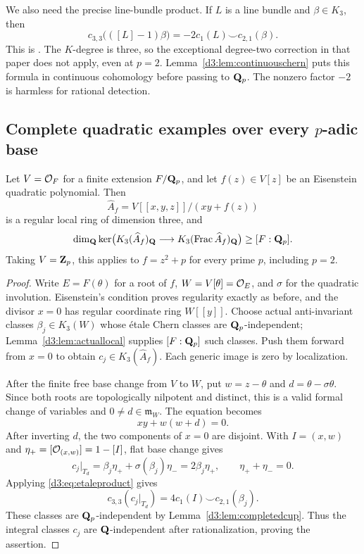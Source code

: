 We also need the precise line-bundle product. If $L$ is a line bundle and $\beta\in K_3$, then
\begin{equation}\label{d3:eq:etaleproduct}
c_{3,3}\bigl(([L]-1)\beta\bigr)
=-2c_1(L)\smile c_{2,1}(\beta).
\end{equation}
This is \cite[Theorem~3.11(i)]{WeibelChern}. The $K$-degree is three, so the exceptional degree-two correction in that paper does not apply, even at $p=2$. Lemma~\ref{d3:lem:continuouschern} puts this formula in continuous cohomology before passing to $\mathbf Q_p$. The nonzero factor $-2$ is harmless for rational detection.

\subsection{Complete quadratic examples over every $p$-adic base}

\begin{theorem}\label{d3:thm:completed}
Let $V=\mathcal O_F$ for a finite extension $F/\mathbf Q_p$, and let $f(z)\in V[z]$ be an Eisenstein quadratic polynomial. Then
\[
\widehat A_f=V[[x,y,z]]/(xy+f(z))
\]
is a regular local ring of dimension three, and
\[
\dim_{\mathbf Q}\ker\bigl(K_3(\widehat A_f)_{\mathbf Q}
\longrightarrow K_3(\operatorname{Frac}\widehat A_f)_{\mathbf Q}\bigr)\geq[F:\mathbf Q_p].
\]
Taking $V=\mathbf Z_p$, this applies to $f=z^2+p$ for every prime $p$, including $p=2$.
\end{theorem}
\begin{proof}
Write $E=F(\theta)$ for a root of $f$, $W=V[\theta]=\mathcal O_E$, and $\sigma$ for the quadratic involution. Eisenstein's condition proves regularity exactly as before, and the divisor $x=0$ has regular coordinate ring $W[[y]]$. Choose actual anti-invariant classes $\beta_j\in K_3(W)$ whose \'etale Chern classes are $\mathbf Q_p$-independent; Lemma~\ref{d3:lem:actuallocal} supplies $[F:\mathbf Q_p]$ such classes. Push them forward from $x=0$ to obtain $c_j\in K_3(\widehat A_f)$. Each generic image is zero by localization.

After the finite free base change from $V$ to $W$, put $w=z-\theta$ and $d=\theta-\sigma\theta$. Since both roots are topologically nilpotent and distinct, this is a valid formal change of variables and $0\ne d\in\mathfrak m_W$. The equation becomes
\[
xy+w(w+d)=0.
\]
After inverting $d$, the two components of $x=0$ are disjoint. With $I=(x,w)$ and $\eta_+=[\mathcal O_{(x,w)}]=1-[I]$, flat base change gives
\[
c_j|_{T_d}=\beta_j\eta_++\sigma(\beta_j)\eta_-
=2\beta_j\eta_+,
\qquad \eta_++\eta_-=0.
\]
Applying \eqref{d3:eq:etaleproduct} gives
\[
c_{3,3}(c_j|_{T_d})=4c_1(I)\smile c_{2,1}(\beta_j).
\]
These classes are $\mathbf Q_p$-independent by Lemma~\ref{d3:lem:completedcup}. Thus the integral classes $c_j$ are $\mathbf Q$-independent after rationalization, proving the assertion.
\end{proof}

